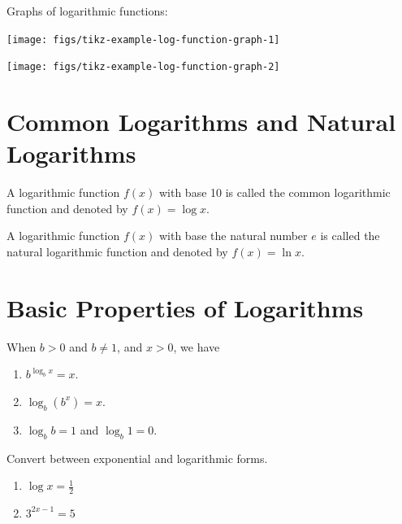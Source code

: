 \documentclass[
  en,11pt]{elegantbook}
\providecommand{\tightlist}{%
  \setlength{\itemsep}{0pt}\setlength{\parskip}{0pt}}
\renewenvironment{example}[1][]{
  \refstepcounter{exam}
  \par\noindent\textbf{\color{main}{\examplename} \theexam #1}
  \rmfamily
}{
  \par\ignorespacesafterend
}
\begin{document}
Graphs of logarithmic functions:

\begin{multicols}{2}

\begin{center}\texttt{[image: figs/tikz-example-log-function-graph-1]} \end{center}

\begin{center}\texttt{[image: figs/tikz-example-log-function-graph-2]} \end{center}

\end{multicols}

\hypertarget{common-logarithms-and-natural-logarithms}{%
\section{Common Logarithms and Natural Logarithms}\label{common-logarithms-and-natural-logarithms}}

A logarithmic function \(f(x)\) with base 10 is called the common logarithmic function and denoted by \(f(x)=\log x\).

A logarithmic function \(f(x)\) with base the natural number \(e\) is called the natural logarithmic function and denoted by \(f(x)=\ln x\).

\hypertarget{basic-properties-of-logarithms}{%
\section{Basic Properties of Logarithms}\label{basic-properties-of-logarithms}}

When \(b>0\) and \(b\neq 1\), and \(x>0\), we have

\begin{enumerate}
\def\labelenumi{\arabic{enumi}.}
\tightlist
\item
  \(b^{\log_bx}=x\).
\item
  \(\log_b(b^x)=x\).
\item
  \(\log_bb=1\) and \(\log_b1=0\).
\end{enumerate}

\begin{example}

Convert between exponential and logarithmic forms.

\begin{enumerate}
\def\labelenumi{\arabic{enumi}.}
\tightlist
\item
  \(\log x=\frac{1}{2}\)
\item
  \(3^{2x-1}=5\)
\end{enumerate}

\end{example}
\end{document}
